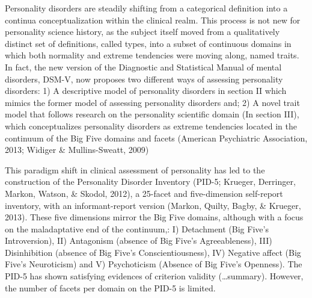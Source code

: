 \documentclass[,man,floatsintext]{apa6}
\theoremstyle{definition}
\theoremstyle{definition}
\theoremstyle{definition}
\theoremstyle{remark}
\begin{document}
Personality disorders are steadily shifting from a categorical
definition into a continua conceptualization within the clinical realm.
This process is not new for personality science history, as the subject
itself moved from a qualitatively distinct set of definitions, called
types, into a subset of continuous domains in which both normality and
extreme tendencies were moving along, named traits. In fact, the new
version of the Diagnostic and Statistical Manual of mental disorders,
DSM-V, now proposes two different ways of assessing personality
disorders: 1) A descriptive model of personality disorders in section II
which mimics the former model of assessing personality disorders and; 2)
A novel trait model that follows research on the personality scientific
domain (In section III), which conceptualizes personality disorders as
extreme tendencies located in the continuum of the Big Five domains and
facets (American Psychiatric Association, 2013; Widiger \&
Mullins-Sweatt, 2009)

This paradigm shift in clinical assessment of personality has led to the
construction of the Personality Disorder Inventory (PID-5; Krueger,
Derringer, Markon, Watson, \& Skodol, 2012), a 25-facet and
five-dimension self-report inventory, with an informant-report version
(Markon, Quilty, Bagby, \& Krueger, 2013). These five dimensions mirror
the Big Five domains, although with a focus on the maladaptative end of
the continuum,: I) Detachment (Big Five's Introversion), II) Antagonism
(absence of Big Five's Agreeableness), III) Disinhibition (absence of
Big Five's Conscientiousness), IV) Negative affect (Big Five's
Neuroticism) and V) Psychoticism (Absence of Big Five's Openness). The
PID-5 has shown satisfying evidences of criterion validity
(\ldots{}summary). However, the number of facets per domain on the PID-5
is limited.
\end{document}
